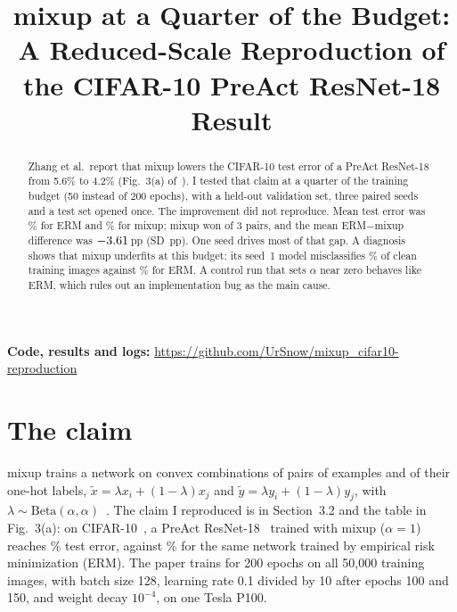 \documentclass[conference]{IEEEtran}
\newcommand{\pp}{\,pp}
\begin{document}
\title{mixup at a Quarter of the Budget: A Reduced-Scale Reproduction of the CIFAR-10 PreAct ResNet-18 Result}

\author{
}

\maketitle

\begin{abstract}
Zhang et al.\ report that mixup lowers the CIFAR-10 test error of a PreAct ResNet-18 from 5.6\% to
4.2\% (Fig.~3(a) of~\cite{zhang2018mixup}). I tested that claim at a quarter of the training budget
(50 instead of 200 epochs), with a held-out validation set, three paired seeds and a test set opened
once. The improvement did not reproduce. Mean test error was \ErmMean\% for ERM and \MixMean\% for
mixup; mixup won \MixWins{} of 3 pairs, and the mean ERM$-$mixup difference was $-3.61$\pp{}
(SD \DiffSD\pp). One seed drives most of that gap. A diagnosis shows that mixup underfits at this
budget: its seed~1 model misclassifies \MixCleanTrain\% of clean training images against
\ErmCleanTrain\% for ERM. A control run that sets $\alpha$ near zero behaves like ERM, which rules out an
implementation bug as the main cause.
\end{abstract}

\noindent\textbf{Code, results and logs:}
\url{https://github.com/UrSnow/mixup_cifar10-reproduction}

\section{The claim}
mixup trains a network on convex combinations of pairs of examples and of their one-hot labels,
$\tilde{x}=\lambda x_i+(1-\lambda)x_j$ and $\tilde{y}=\lambda y_i+(1-\lambda)y_j$, with
$\lambda\sim\mathrm{Beta}(\alpha,\alpha)$~\cite{zhang2018mixup}. The claim I reproduced is in
Section~3.2 and the table in Fig.~3(a): on CIFAR-10~\cite{krizhevsky2009cifar}, a PreAct
ResNet-18~\cite{he2016identity} trained with mixup ($\alpha=1$) reaches \PaperMix\% test error,
against \PaperErm\% for the same network trained by empirical risk minimization (ERM). The paper
trains for 200 epochs on all 50,000 training images, with batch size 128, learning rate 0.1 divided
by 10 after epochs 100 and 150, and weight decay $10^{-4}$, on one Tesla P100.
\end{document}
